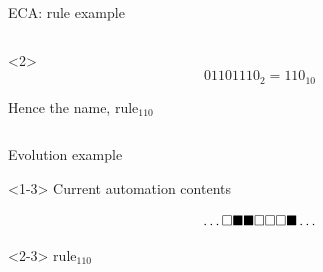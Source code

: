 \documentclass[presentation,aspectratio=169,smaller]{beamer}
\begin{document}
\begin{frame}[label={sec:org132b203}]{ECA: rule example}
\begin{columns}
\begin{column}{0.8\columnwidth}
\begin{onlyenv}<2>
\begin{equation*}
  01101110_2 = 110_{10}
\end{equation*}

Hence the name, \(\text{rule}_{110}\)
\end{onlyenv}
\end{column}
\end{columns}
\end{frame}

\begin{frame}[label={sec:org3545853},t]{Evolution example}
\begin{onlyenv}<1-3>
Current automation contents

\begin{equation*}
  \hfill
  \dots
  \square
  \blacksquare
  \blacksquare
  \square
  \square
  \square
  \blacksquare
  \dots
  \hfill
\end{equation*}
\end{onlyenv}

\begin{onlyenv}<2-3>
\(\text{rule}_{110}\)


\end{onlyenv}
\end{frame}
\end{document}
